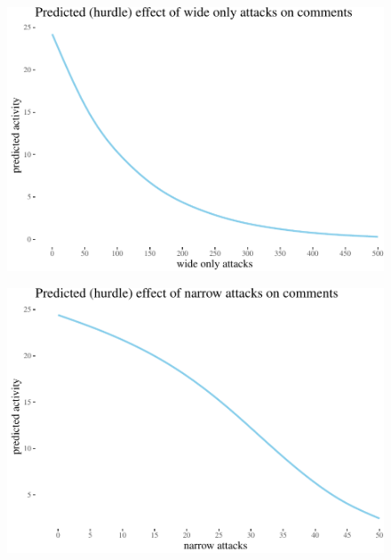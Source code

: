 \documentclass[a4paper,fleqn]{cas-dc}
\begin{document}
\begin{figure}
\centering
\begin{center}\includegraphics[width=\linewidth]{images/unnamed-chunk-46-1} \end{center}
\end{figure}


\begin{figure}
\centering

\begin{center}\includegraphics[width=0.85\linewidth]{images/unnamed-chunk-47-1} \end{center}
\end{figure}
\end{document}

